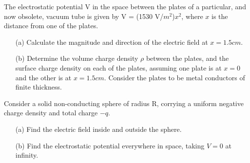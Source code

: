 \documentclass[11pt,letterpaper,boxed]{hmcpset}
\begin{document}
	\begin{problem} [Problem 2]
		The electrostatic potential V in the space between the plates of a particular, and now obsolete,
		vacuum tube is given by V = (1530 V/$m^2$)$x^2$, where $x$ is the distance from one of the plates.
		\begin{enumerate}
			\item [(a)] Calculate the magnitude and direction of the electric field at $x = 1.5 cm$.
			\item [(b)] Determine the volume charge density $\rho$ between the plates, and the surface charge density on each of the plates, assuming one plate is at $x = 0$ and the other is at $x = 1.5 cm$. Consider the plates to be metal conductors of finite thickness.
		\end{enumerate}

	\end{problem}
	
	\begin{solution}
	\vfill
	\end{solution}
	\newpage

	\begin{problem}[Problem 3*]
		Consider a solid non-conducting sphere of radius R, corrying a uniform negative charge density and total charge $-q$.
		\begin{enumerate}
			\item [(a)] Find the electric field inside and outside the sphere.
			\item [(b)] Find the electrostatic potential everywhere in space, taking $V = 0$ at infinity.
		\end{enumerate}
	
	\end{problem}
	
	\begin{solution}
	\vfill
	\end{solution}
	\newpage
\end{document}
